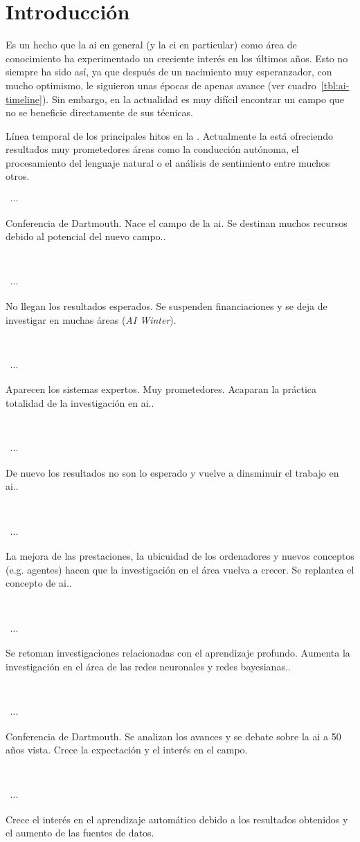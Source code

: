 \chapter{Introducción}
\label{ch:intro}

Es un hecho que la \ac{ai} en general (y la \ac{ci} en particular) como área de conocimiento ha experimentado un creciente interés en los últimos años. Esto no siempre ha sido así, ya que después de un nacimiento muy esperanzador, con mucho optimismo, le siguieron unas épocas de apenas avance (ver cuadro~\ref{tbl:ai-timeline}). Sin embargo, en la actualidad es muy difícil encontrar un campo que no se beneficie directamente de sus técnicas.

\begin{margintable}
	\caption{Línea temporal de los principales hitos en la . Actualmente la  está ofreciendo resultados muy prometedores áreas como la conducción autónoma, el procesamiento del lenguaje natural o el análisis de sentimiento entre muchos otros.}
	\label{tbl:ai-timeline}
	\centering
	\begin{minipage}[t]{\linewidth}
		\newcommand\ytl[2]{
			\parbox[b]{1cm}{\hfill{\color{cyan}\bfseries\sffamily #1}~$\cdots$~}
			\parbox[c]{3.8cm}{\vspace{7pt}\raggedright\sffamily #2.\\[0pt]}\\[0pt]}
		\color{gray}

		\ytl{1956}{Conferencia de Dartmouth. Nace el campo de la \ac{ai}. Se destinan muchos recursos debido al potencial del nuevo campo.}
		\ytl{1974}{No llegan los resultados esperados. Se suspenden financiaciones y se deja de investigar en muchas áreas (\textit{AI Winter})}
		\ytl{1980}{Aparecen los sistemas expertos. Muy prometedores. Acaparan la práctica totalidad de la investigación en \ac{ai}.}
		\ytl{1987}{De nuevo los resultados no son lo esperado y vuelve a dinsminuir el trabajo en \ac{ai}.}
		\ytl{1990}{La mejora de las prestaciones, la ubicuidad de los ordenadores y nuevos conceptos (e.g. agentes) hacen que la investigación en el área vuelva a crecer. Se replantea el concepto de \ac{ai}.}
		\ytl{2000}{Se retoman investigaciones relacionadas con el aprendizaje profundo. Aumenta la investigación en el área de las redes neuronales y redes bayesianas.}
		\ytl{2006}{Conferencia de Dartmouth. Se analizan los avances y se debate sobre la \ac{ai} a 50 años vista. Crece la expectación y el interés en el campo}
		\ytl{2007}{Crece el interés en el aprendizaje automático debido a los resultados obtenidos y el aumento de las fuentes de datos}
		\bigskip
	\end{minipage}%
\end{margintable}

